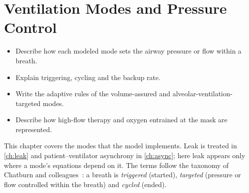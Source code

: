\chapter{Ventilation Modes and Pressure Control}
\label{ch:ch13}

\begin{objectives}
\begin{itemize}[leftmargin=*]
  \item Describe how each modeled mode sets the airway pressure or flow within a breath.
  \item Explain triggering, cycling and the backup rate.
  \item Write the adaptive rules of the volume-assured and alveolar-ventilation-targeted modes.
  \item Describe how high-flow therapy and oxygen entrained at the mask are represented.
\end{itemize}
\end{objectives}

This chapter covers the modes that the model implements. Leak is treated in \cref{ch:leak} and patient--ventilator asynchrony in \cref{ch:async}; here leak appears only where a mode's equations depend on it. The terms follow the taxonomy of Chatburn and colleagues~\citep{chatburn2014}: a breath is \emph{triggered} (started), \emph{targeted} (pressure or flow controlled within the breath) and \emph{cycled} (ended).

